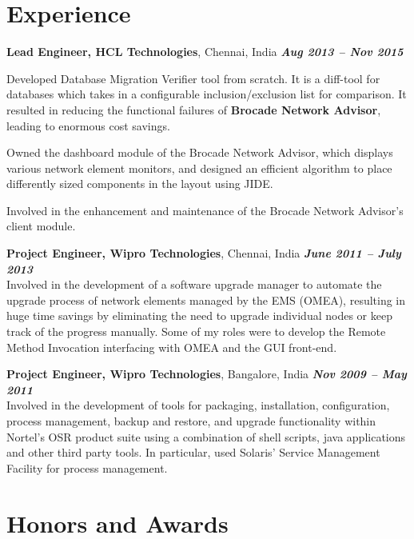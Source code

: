 \documentclass[margin]{resume}
\begin{document}
\begin{resume}
\section{\mysidestyle Experience}
\textbf{Lead Engineer, HCL Technologies}, Chennai, India \hfill \textbf{\textit{Aug 2013 -- Nov 2015}}\\
\begin{list2}
\item Developed Database Migration Verifier tool from scratch. It is a
diff-tool for databases which takes in a configurable inclusion/exclusion list
for comparison. It resulted in reducing the functional failures of
\textbf{Brocade Network Advisor}, leading to enormous cost savings.
\item Owned the dashboard module of the Brocade Network Advisor, which displays
various network element monitors, and designed an efficient algorithm to place
differently sized components in the layout using JIDE.
\item Involved in the enhancement and maintenance of the Brocade Network
Advisor's client module.
\end{list2}
	
\textbf{Project Engineer, Wipro Technologies}, Chennai, India \hfill \textbf{\textit{June 2011 -- July 2013}}\\
Involved in the development of a software upgrade manager to automate the
upgrade process of network elements managed by the EMS (OMEA), resulting in
huge time savings by eliminating the need to upgrade individual nodes or keep
track of the progress manually. Some of my roles were to develop the Remote
Method Invocation interfacing with OMEA and the GUI front-end.

\textbf{Project Engineer, Wipro Technologies}, Bangalore, India \hfill \textbf{\textit{Nov 2009 -- May 2011}}\\
Involved in the development of tools for packaging, installation,
configuration, process management, backup and restore, and upgrade
functionality within Nortel's OSR product suite using a combination of shell
scripts, java applications and other third party tools. In particular, used
Solaris' Service Management Facility for process management.

\section{\mysidestyle Honors and Awards}
\begin{list2}


\end{list2}
\end{resume}
\end{document}
